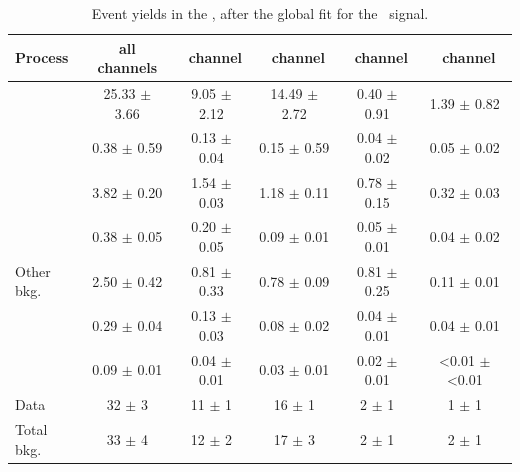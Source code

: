   \begin{table}[htbp]
	\centering
	\caption{Event yields in the \STCR, after the global fit for the \Zut\ signal.}
	\begin{tabular} {l c c c c c  }
		\toprule
		Process & all channels & \mumumu\ channel & \emumu\ channel & \eemu\ channel &\eee\ channel  \\
		\midrule
		\NPL\ \ttbar& 25.33 $ \pm $ 3.66 &  9.05 $\pm$ 2.12 & 14.49 $\pm$ 2.72 & 0.40 $\pm$ 0.91 & 1.39 $\pm$ 0.82 \\ 
		\ttZ 		&  0.38 $ \pm $ 0.59 &  0.13 $\pm$ 0.04 &  0.15 $\pm$ 0.59 & 0.04 $\pm$ 0.02 & 0.05 $\pm$ 0.02 \\ 
		\WZ 		&  3.82 $ \pm $ 0.20 &  1.54 $\pm$ 0.03 &  1.18 $\pm$ 0.11 & 0.78 $\pm$ 0.15 & 0.32 $\pm$ 0.03\\ 
		\ZZ 		&  0.38 $ \pm $ 0.05 &  0.20 $\pm$ 0.05 &  0.09 $\pm$ 0.01 & 0.05 $\pm$ 0.01 & 0.04 $\pm$ 0.02\\ 
		Other bkg.	&  2.50 $ \pm $ 0.42 &  0.81 $\pm$ 0.33 &  0.78 $\pm$ 0.09 & 0.81 $\pm$ 0.25 & 0.11 $\pm$ 0.01 \\ 
		\tZq 		&  0.29 $ \pm $ 0.04 &  0.13 $\pm$ 0.03 &  0.08 $\pm$ 0.02 & 0.04 $\pm$ 0.01 & 0.04 $\pm$ 0.01 \B \\ 
		\kZut  		&  0.09 $ \pm $ 0.01 &  0.04 $\pm$ 0.01 &  0.03 $\pm$ 0.01 & 0.02 $\pm$ 0.01 & <0.01 $\pm$ <0.01 \T \B\\
		\hdashline
		Data 		& 32 $ \pm $ 3 & 11 $\pm$ 1 & 16 $\pm$ 1 & 2 $\pm$ 1 & 1  $\pm$ 1 \T \\
		Total bkg.	& 33 $ \pm $ 4 & 12 $\pm$ 2 & 17 $\pm$ 3 & 2 $\pm$ 1 & 2  $\pm$ 1 \\
		\bottomrule
	\end{tabular}
	\label{tab:PYieldSTCR}
\end{table}

